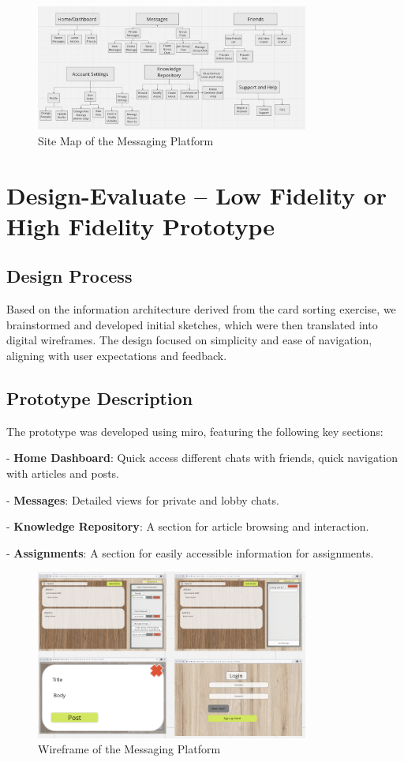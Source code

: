 \documentclass[12pt,a4paper]{article}
\begin{document}
\begin{figure}[H]
\centering
\includegraphics[width=0.8\textwidth]{sitemap.png} %
\caption{Site Map of the Messaging Platform}
\label{fig:sitemap}
\end{figure}

\section{Design-Evaluate – Low Fidelity or High Fidelity Prototype }
\subsection*{Design Process}
Based on the information architecture derived from the card sorting exercise, we brainstormed and developed initial sketches, which were then translated into digital wireframes. The design focused on simplicity and ease of navigation, aligning with user expectations and feedback.

\subsection*{Prototype Description}
The prototype was developed using miro, featuring the following key sections:

- \textbf{Home Dashboard}: Quick access different chats with friends, quick navigation with articles and posts.

- \textbf{Messages}: Detailed views for private and lobby chats.

- \textbf{Knowledge Repository}: A section for article browsing and interaction.

- \textbf{Assignments}: A section for easily accessible information for assignments.

\begin{figure}[H]
\centering
\includegraphics[width=0.8\textwidth]{wireframe.png}
\caption{Wireframe of the Messaging Platform}
\label{fig:wireframe}
\end{figure}
\end{document}
